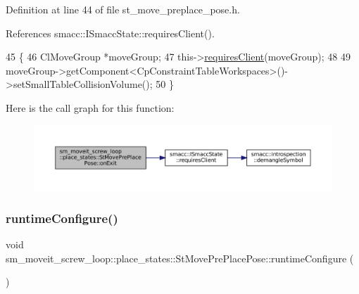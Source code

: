 Definition at line 44 of file st\+\_\+move\+\_\+preplace\+\_\+pose.\+h.



References smacc\+::\+I\+Smacc\+State\+::requires\+Client().


\begin{DoxyCode}
45             \{
46                 ClMoveGroup *moveGroup;
47                 this->\hyperlink{classsmacc_1_1ISmaccState_a7f95c9f0a6ea2d6f18d1aec0519de4ac}{requiresClient}(moveGroup);
48 
49                 moveGroup->getComponent<CpConstraintTableWorkspaces>()->setSmallTableCollisionVolume();
50             \}
\end{DoxyCode}
Here is the call graph for this function\+:
\nopagebreak
\begin{figure}[H]
\begin{center}
\leavevmode
\includegraphics[width=350pt]{structsm__moveit__screw__loop_1_1place__states_1_1StMovePrePlacePose_a7d6cc9abb6954a44b4c79d70a84cd9cc_cgraph}
\end{center}
\end{figure}
\mbox{\label{structsm__moveit__screw__loop_1_1place__states_1_1StMovePrePlacePose_abc507e21d3f09dae6320613a2b590430}} 
\subsubsection{\texorpdfstring{runtime\+Configure()}{runtimeConfigure()}}
{\footnotesize\ttfamily void sm\+\_\+moveit\+\_\+screw\+\_\+loop\+::place\+\_\+states\+::\+St\+Move\+Pre\+Place\+Pose\+::runtime\+Configure (\begin{DoxyParamCaption}{ }\end{DoxyParamCaption})\hspace{0.3cm}{\ttfamily [inline]}}




